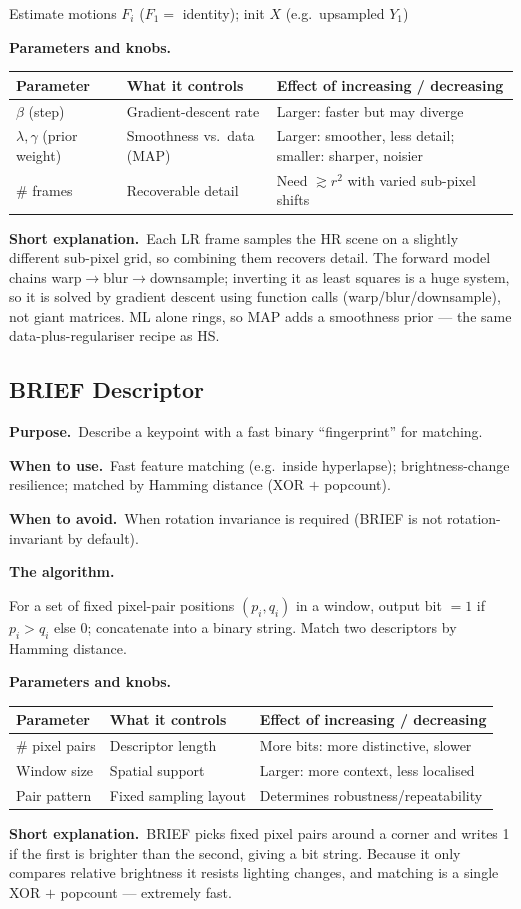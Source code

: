 \documentclass[10pt]{article}
\makeatletter
\newcommand{\Purpose}{\par\smallskip\textbf{Purpose.}\ }
\newcommand{\WhenUse}{\par\textbf{When to use.}\ }
\newcommand{\WhenAvoid}{\par\textbf{When to avoid.}\ }
\newcommand{\TheAlgo}{\par\smallskip\textbf{The algorithm.}\par\nopagebreak}
\newcommand{\Knobs}{\par\smallskip\textbf{Parameters and knobs.}\par\nopagebreak}
\newcommand{\ShortExp}{\par\smallskip\textbf{Short explanation.}\ }
\newenvironment{ptable}{\begin{center}\small\begin{tabular}{@{}p{2.5cm} p{5.9cm} p{6.2cm}@{}}\toprule
Parameter & What it controls & Effect of increasing / decreasing \\ \midrule}
{\bottomrule\end{tabular}\end{center}}
\makeatother
\begin{document}
\begin{algorithm}[H]
\SetAlgoLined
{}
Estimate motions $F_i$ ($F_1=$ identity); init $X$ (e.g.\ upsampled $Y_1$)\;
\caption{Iterative super-resolution (ML/MAP)}
\end{algorithm}

\Knobs
\begin{ptable}
$\beta$ (step) & Gradient-descent rate & Larger: faster but may diverge \\
$\lambda,\gamma$ (prior weight) & Smoothness vs.\ data (MAP) & Larger: smoother, less detail; smaller: sharper, noisier \\
\# frames & Recoverable detail & Need $\gtrsim r^2$ with varied sub-pixel shifts \\
\end{ptable}
\ShortExp Each LR frame samples the HR scene on a slightly different sub-pixel grid, so combining them
recovers detail. The forward model chains warp$\to$blur$\to$downsample; inverting it as least squares is a
huge system, so it is solved by gradient descent using function calls (warp/blur/downsample), not giant
matrices. ML alone rings, so MAP adds a smoothness prior --- the same data-plus-regulariser recipe as HS.

\subsection{BRIEF Descriptor}
\Purpose Describe a keypoint with a fast binary ``fingerprint'' for matching.
\WhenUse Fast feature matching (e.g.\ inside hyperlapse); brightness-change resilience; matched by Hamming
distance (XOR $+$ popcount).
\WhenAvoid When rotation invariance is required (BRIEF is not rotation-invariant by default).
\TheAlgo For a set of fixed pixel-pair positions $(p_i,q_i)$ in a window, output bit $=1$ if
$p_i>q_i$ else $0$; concatenate into a binary string. Match two descriptors by Hamming distance.
\Knobs
\begin{ptable}
\# pixel pairs & Descriptor length & More bits: more distinctive, slower \\
Window size & Spatial support & Larger: more context, less localised \\
Pair pattern & Fixed sampling layout & Determines robustness/repeatability \\
\end{ptable}
\ShortExp BRIEF picks fixed pixel pairs around a corner and writes 1 if the first is brighter than the
second, giving a bit string. Because it only compares relative brightness it resists lighting changes, and
matching is a single XOR $+$ popcount --- extremely fast.
\end{document}
